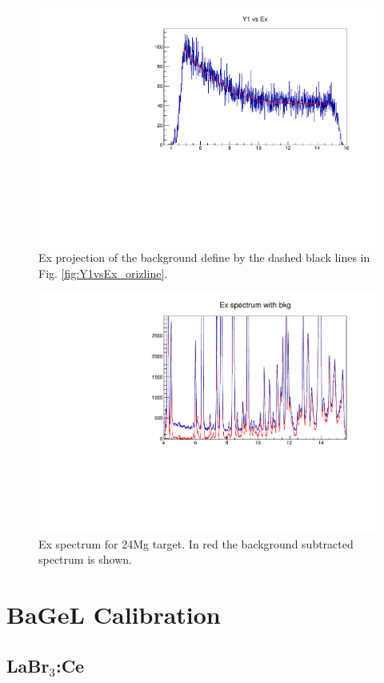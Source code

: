 \documentclass[]{report}
\begin{document}
		\begin{figure}
			\includegraphics[width=\linewidth]{Figure/bkg/Chained_24Mg_bkg_projection_35_25.pdf}
			\caption{Ex projection of the background define by the dashed black lines in Fig. \ref{fig:Y1vsEx_orizline}.}
			\label{fig:Ex_bkg}
		\end{figure}

		\begin{figure}
			\includegraphics[width=\linewidth]{Figure/bkg/Chained_24Mg_Ex__withandwithout_bkg.pdf}
			\caption{Ex spectrum for 24Mg target. In red the background subtracted spectrum is shown.}
			\label{fig:Ex_bkgandnobkg}
		\end{figure}



\chapter{BaGeL Calibration}
\section{LaBr$_3$:Ce}
\end{document}
